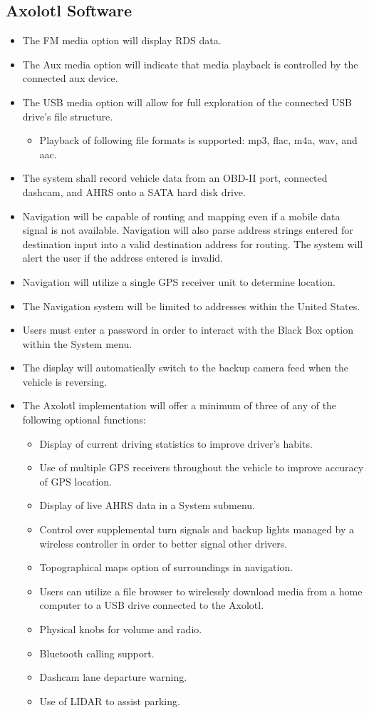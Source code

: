 \documentclass[onecolumn, draftclsnofoot,10pt, compsoc]{IEEEtran}
\begin{document}
\subsection{Axolotl Software}
\begin{itemize}
	\item The FM media option will display RDS data.
	\item The Aux media option will indicate that media playback is controlled by the connected aux device.
	\item The USB media option will allow for full exploration of the connected USB drive's file structure.
	\begin{itemize}
		\item Playback of following file formats is supported: mp3, flac, m4a, wav, and aac.
	\end{itemize}
	\item The system shall record vehicle data from an OBD-II port, connected dashcam, and AHRS onto a SATA hard disk drive.
	\item Navigation will be capable of routing and mapping even if a mobile data signal is not available. Navigation will also parse address strings entered for destination input into a valid destination address for routing. The system will alert the user if the address entered is invalid.
	\item Navigation will utilize a single GPS receiver unit to determine location.
	\item The Navigation system will be limited to addresses within the United States.
	\item Users must enter a password in order to interact with the Black Box option within the System menu.
	\item The display will automatically switch to the backup camera feed when the vehicle is reversing. 
	\item The Axolotl implementation will offer a minimum of three of any of the following optional functions:
	\begin{itemize}
		\item Display of current driving statistics to improve driver's habits.
		\item Use of multiple GPS receivers throughout the vehicle to improve accuracy of GPS location.
		\item Display of live AHRS data in a System submenu.
		\item Control over supplemental turn signals and backup lights managed by a wireless controller in order to better signal other drivers.
		\item Topographical maps option of surroundings in navigation.
		\item Users can utilize a file browser to wirelessly download media from a home computer to a USB drive connected to the Axolotl.
		\item Physical knobs for volume and radio.
		\item Bluetooth calling support.
		\item Dashcam lane departure warning.
		\item Use of LIDAR to assist parking.
		\end{itemize}
\end{itemize}
\end{document}
